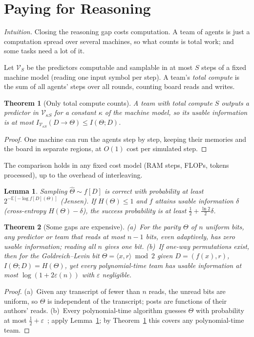 \documentclass[conference]{IEEEtran}
\newtheorem{theorem}{Theorem}
\newtheorem{lemma}{Lemma}
\theoremstyle{definition}
\newcommand{\I}{I}
\newcommand{\Hh}{H}
\newcommand{\E}{\mathbb{E}}
\newcommand{\V}{\mathcal V}
\newcommand{\intuition}[1]{\noindent\textit{Intuition.} #1}
\begin{document}
\section{Paying for Reasoning}\label{sec:compute}

\intuition{Closing the reasoning gap costs computation. A team of agents is just
a computation spread over several machines, so what counts is total work; and
some tasks need a lot of it.}

\smallskip
Let $\V_S$ be the predictors computable and samplable in at most $S$ steps of a
fixed machine model (reading one input symbol per step). A team's \emph{total
compute} is the sum of all agents' steps over all rounds, counting board reads
and writes.

\begin{theorem}[Only total compute counts]\label{thm:compute}
A team with total compute $S$ outputs a predictor in $\V_{\kappa S}$ for a
constant $\kappa$ of the machine model, so its usable information is at most
$\I_{\V_{\kappa S}}(D\to\Theta)\le\I(\Theta;D)$.
\end{theorem}
\begin{proof}
One machine can run the agents step by step, keeping their memories and the
board in separate regions, at $O(1)$ cost per simulated step.
\end{proof}
\noindent The comparison holds in any fixed cost model (RAM steps, FLOPs, tokens
processed), up to the overhead of interleaving.

\begin{lemma}\label{lem:guess}
Sampling $\hat\Theta\sim f[D]$ is correct with probability at least
$2^{-\E[-\log f[D](\Theta)]}$ (Jensen). If $\Hh(\Theta)\le1$ and $f$ attains usable
information $\delta$ (cross-entropy $\Hh(\Theta)-\delta$), the success
probability is at least $\frac12+\frac{\ln2}{2}\delta$.
\end{lemma}

\begin{theorem}[Some gaps are expensive]\label{thm:lower}
(a)~For the parity $\Theta$ of $n$ uniform bits, any predictor or team that
reads at most $n-1$ bits, even adaptively, has zero usable information; reading
all $n$ gives one bit. (b)~If one-way permutations exist, then for the
Goldreich--Levin bit $\Theta=\langle x,r\rangle\bmod 2$ given $D=(f(x),r)$,
$\I(\Theta;D)=\Hh(\Theta)$, yet every polynomial-time team has usable information
at most $\log(1+2\varepsilon(n))$ with $\varepsilon$ negligible.
\end{theorem}
\begin{proof}
(a)~Given any transcript of fewer than $n$ reads, the unread bits are uniform,
so $\Theta$ is independent of the transcript; posts are functions of their
authors' reads. (b)~Every polynomial-time algorithm guesses $\Theta$ with
probability at most $\frac12+\varepsilon$~\cite{goldreich1989}; apply
Lemma~\ref{lem:guess}; by Theorem~\ref{thm:compute} this covers any
polynomial-time team.
\end{proof}
\end{document}

